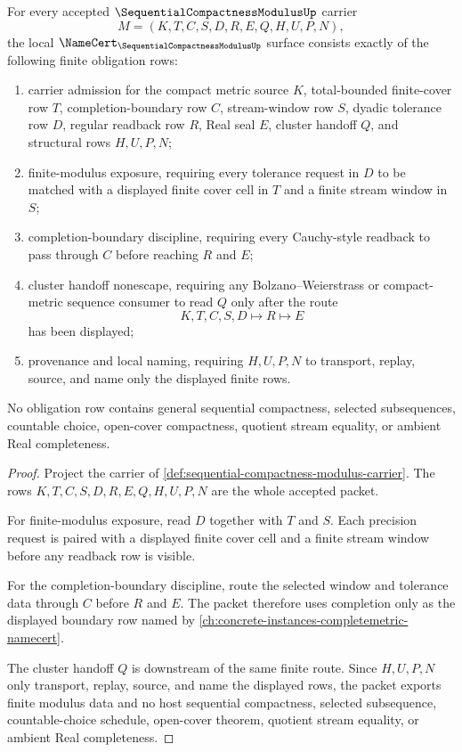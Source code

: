 \begin{theorem}
\label{thm:sequential-compactness-modulus-namecert-obligations}
For every accepted $\SequentialCompactnessModulusUp$ carrier
$$
M=(K,T,C,S,D,R,E,Q,H,U,P,N),
$$
the local $\NameCert_{\SequentialCompactnessModulusUp}$ surface consists exactly of the following finite obligation rows:
\begin{enumerate}
\item carrier admission for the compact metric source $K$, total-bounded finite-cover row $T$, completion-boundary row $C$, stream-window row $S$, dyadic tolerance row $D$, regular readback row $R$, Real seal $E$, cluster handoff $Q$, and structural rows $H,U,P,N$;
\item finite-modulus exposure, requiring every tolerance request in $D$ to be matched with a displayed finite cover cell in $T$ and a finite stream window in $S$;
\item completion-boundary discipline, requiring every Cauchy-style readback to pass through $C$ before reaching $R$ and $E$;
\item cluster handoff nonescape, requiring any Bolzano--Weierstrass or compact-metric sequence consumer to read $Q$ only after the route
$$
K,T,C,S,D \longmapsto R \longmapsto E
$$
has been displayed;
\item provenance and local naming, requiring $H,U,P,N$ to transport, replay, source, and name only the displayed finite rows.
\end{enumerate}
No obligation row contains general sequential compactness, selected subsequences, countable choice, open-cover compactness, quotient stream equality, or ambient Real completeness.
\end{theorem}
\begin{proof}
Project the carrier of \autoref{def:sequential-compactness-modulus-carrier}. The rows $K,T,C,S,D,R,E,Q,H,U,P,N$ are the whole accepted packet.

For finite-modulus exposure, read $D$ together with $T$ and $S$. Each precision request is paired with a displayed finite cover cell and a finite stream window before any readback row is visible.

For the completion-boundary discipline, route the selected window and tolerance data through $C$ before $R$ and $E$. The packet therefore uses completion only as the displayed boundary row named by \autoref{ch:concrete-instances-completemetric-namecert}.

The cluster handoff $Q$ is downstream of the same finite route. Since $H,U,P,N$ only transport, replay, source, and name the displayed rows, the packet exports finite modulus data and no host sequential compactness, selected subsequence, countable-choice schedule, open-cover theorem, quotient stream equality, or ambient Real completeness.
\end{proof}

